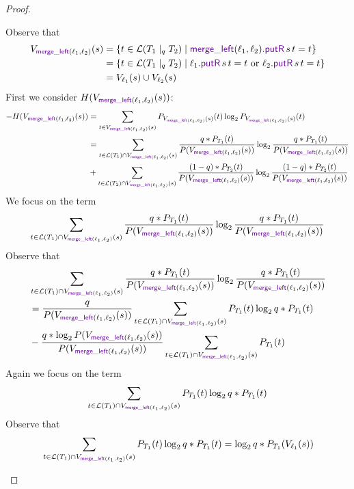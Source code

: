 \documentclass[acmsmall,screen,anonymous]{acmart}
\begin{document}
\begin{proof}
\begin{enumerate}
Observe that 
\begin{align*}
V_{ \MergeLOf{\Lens_1}{\Lens_2}}(s) &= \{t \in \mathcal{L}(T_1 \; |_q \; T_2) \; | \;  \MergeLOf{\Lens_1}{\Lens_2}.\PutROf{s}{t} = t\}\\
&= \{t \in \mathcal{L}(T_1 \; |_q \; T_2) \; | \;  \ell_1.\PutROf{s}{t} = t \text{ or } \ell_2.\PutROf{s}{t} = t\}\\
&= V_{\ell_1}(s) \cup V_{\ell_2}(s)
\end{align*}
First we consider $H(V_{ \MergeLOf{\Lens_1}{\Lens_2}}(s))$:
\begin{align*}
-H(V_{ \MergeLOf{\Lens_1}{\Lens_2}}(s)) &= \sum_{t \in V_{ \MergeLOf{\Lens_1}{\Lens_2}}(s)}P_{V_{ \MergeLOf{\Lens_1}{\Lens_2}}(s)}(t) \log_2 P_{V_{ \MergeLOf{\Lens_1}{\Lens_2}}(s)}(t)\\
&= \sum_{t \in \mathcal{L}(T_1) \cap V_{ \MergeLOf{\Lens_1}{\Lens_2}}(s)}\frac{q * P_{T_1}(t)}{P(V_{ \MergeLOf{\Lens_1}{\Lens_2}}(s))} \log_2 \frac{q * P_{T_1}(t)}{P(V_{ \MergeLOf{\Lens_1}{\Lens_2}}(s))} \\
&+ \sum_{t \in \mathcal{L}(T_2) \cap V_{ \MergeLOf{\Lens_1}{\Lens_2}}(s)}\frac{(1-q) * P_{T_2}(t)}{P(V_{ \MergeLOf{\Lens_1}{\Lens_2}}(s))} \log_2 \frac{(1-q) * P_{T_2}(t)}{P(V_{ \MergeLOf{\Lens_1}{\Lens_2}}(s))}
\end{align*}
We focus on the term 
$$\sum_{t \in \mathcal{L}(T_1) \cap V_{ \MergeLOf{\Lens_1}{\Lens_2}}(s)}\frac{q * P_{T_1}(t)}{P(V_{ \MergeLOf{\Lens_1}{\Lens_2}}(s))} \log_2 \frac{q * P_{T_1}(t)}{P(V_{ \MergeLOf{\Lens_1}{\Lens_2}}(s))}$$
Observe that
\begin{align*}
&\sum_{t \in \mathcal{L}(T_1) \cap V_{ \MergeLOf{\Lens_1}{\Lens_2}}(s)}\frac{q * P_{T_1}(t)}{P(V_{ \MergeLOf{\Lens_1}{\Lens_2}}(s))} \log_2 \frac{q * P_{T_1}(t)}{P(V_{ \MergeLOf{\Lens_1}{\Lens_2}}(s))}\\
&= \frac{q}{P(V_{ \MergeLOf{\Lens_1}{\Lens_2}}(s))}\sum_{t \in \mathcal{L}(T_1) \cap V_{ \MergeLOf{\Lens_1}{\Lens_2}}(s)}P_{T_1}(t) \log_2 q * P_{T_1}(t)\\
&- \frac{q * \log_2 P(V_{ \MergeLOf{\Lens_1}{\Lens_2}}(s))}{P(V_{ \MergeLOf{\Lens_1}{\Lens_2}}(s))}\sum_{t \in \mathcal{L}(T_1) \cap V_{ \MergeLOf{\Lens_1}{\Lens_2}}(s)}P_{T_1}(t)
\end{align*}
Again we focus on the term
$$\sum_{t \in \mathcal{L}(T_1) \cap V_{ \MergeLOf{\Lens_1}{\Lens_2}}(s)}P_{T_1}(t) \log_2 q * P_{T_1}(t)$$
Observe that
\begin{align*}
&\sum_{t \in \mathcal{L}(T_1) \cap V_{ \MergeLOf{\Lens_1}{\Lens_2}}(s)}P_{T_1}(t) \log_2 q * P_{T_1}(t) = \log_2 q * P_{T_1}(V_{\ell_1}(s))\\

\end{align*}
\end{enumerate}
\end{proof}
\end{document}
